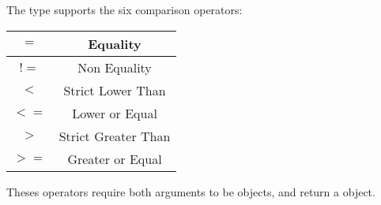 The  type supports the six comparison operators:\newline

\begin{tabular}{|c|c|}
\hline
$=$ & Equality \\
\hline
$!=$ & Non Equality \\
\hline
$<$  & Strict Lower Than \\
\hline
$<=$  & Lower or Equal \\
\hline
$>$  & Strict Greater Than \\
\hline
$>=$  & Greater or Equal \\
\hline
\end{tabular}

\vspace{2mm}
Theses operators require both arguments to be  objects, and return a  object.



